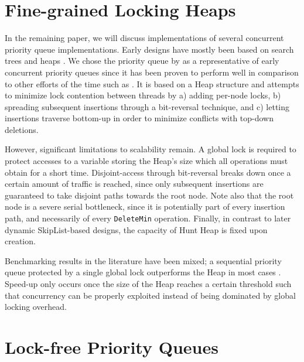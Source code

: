 \documentclass[a4paper,10pt]{article}
\begin{document}
\section{Fine-grained Locking Heaps} \label{sec:hunt}

In the remaining paper, we will discuss implementations of several concurrent priority queue implementations.
Early designs have mostly been based on search trees \cite{boyar1994chromatic,johnson1991highly} and
heaps \cite{ayani1990lr,biswas1987simultaneous,das1996distributed,deo1992parallel,huang1991evaluation,
luchetti1993some,mans1998portable,olariu1991optimal,prasad1995parallel}.
We chose the priority queue by \citeauthor{hunt1996efficient} \cite{hunt1996efficient}
as a representative of early concurrent priority queues since it has been proven to
perform well \cite{shavit2000skiplist} in comparison to other efforts of the time such as \cite{nageshwara1988concurrent,ayani1990lr,yan1998lock}. %
It is based on a Heap
structure and attempts to minimize lock contention between threads by a) adding per-node
locks, b) spreading subsequent insertions through a bit-reversal technique, %
and c) letting insertions traverse bottom-up in order to minimize conflicts with
top-down deletions.

However, significant limitations to scalability remain. A global lock is required
to protect accesses to a variable storing the Heap's size which all operations
must obtain for a short time. Disjoint-access through bit-reversal breaks down
once a certain amount of traffic is reached, since only subsequent insertions
are guaranteed to take disjoint paths towards the root node. Note also that
the root node is a severe serial bottleneck, since it is potentially part of
every insertion path, and necessarily of every \lstinline|DeleteMin| operation.
Finally, in contrast to later dynamic SkipList-based designs, the capacity of Hunt Heap
is fixed upon creation.

Benchmarking results in the literature have been mixed; a sequential priority
queue protected by a single global lock outperforms the \citeauthor{hunt1996efficient}
Heap in most cases \cite{hunt1996efficient,sundell2003fast}. Speed-up only occurs once
the size of the Heap reaches a certain threshold such that concurrency
can be properly exploited instead of being dominated by global locking overhead.

\section{Lock-free Priority Queues} \label{sec:lockfree}
\end{document}
